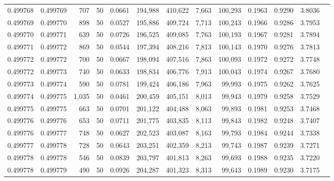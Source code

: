 \begin{tabular}{rrrrrrrrrrrrr}
0.499768 & 0.499769 &   707 &  50 &                                     0.0661 & 194,988 & 410,622 &   7,663 & 100,293 & 0.1963 & 0.9290 & 3.8036 \\
0.499769 & 0.499770 &   898 &  50 &                                     0.0527 & 195,886 & 409,724 &   7,713 & 100,243 & 0.1966 & 0.9286 & 3.7953 \\
0.499770 & 0.499771 &   639 &  50 &                                     0.0726 & 196,525 & 409,085 &   7,763 & 100,193 & 0.1967 & 0.9281 & 3.7894 \\
0.499771 & 0.499772 &   869 &  50 &                                     0.0544 & 197,394 & 408,216 &   7,813 & 100,143 & 0.1970 & 0.9276 & 3.7813 \\
0.499772 & 0.499772 &   700 &  50 &                                     0.0667 & 198,094 & 407,516 &   7,863 & 100,093 & 0.1972 & 0.9272 & 3.7748 \\
0.499772 & 0.499773 &   740 &  50 &                                     0.0633 & 198,834 & 406,776 &   7,913 & 100,043 & 0.1974 & 0.9267 & 3.7680 \\
0.499773 & 0.499774 &   590 &  50 &                                     0.0781 & 199,424 & 406,186 &   7,963 &  99,993 & 0.1975 & 0.9262 & 3.7625 \\
0.499774 & 0.499775 & 1,035 &  50 &                                     0.0461 & 200,459 & 405,151 &   8,013 &  99,943 & 0.1979 & 0.9258 & 3.7529 \\
0.499775 & 0.499775 &   663 &  50 &                                     0.0701 & 201,122 & 404,488 &   8,063 &  99,893 & 0.1981 & 0.9253 & 3.7468 \\
0.499776 & 0.499776 &   653 &  50 &                                     0.0711 & 201,775 & 403,835 &   8,113 &  99,843 & 0.1982 & 0.9248 & 3.7407 \\
0.499776 & 0.499777 &   748 &  50 &                                     0.0627 & 202,523 & 403,087 &   8,163 &  99,793 & 0.1984 & 0.9244 & 3.7338 \\
0.499777 & 0.499778 &   728 &  50 &                                     0.0643 & 203,251 & 402,359 &   8,213 &  99,743 & 0.1987 & 0.9239 & 3.7271 \\
0.499778 & 0.499778 &   546 &  50 &                                     0.0839 & 203,797 & 401,813 &   8,263 &  99,693 & 0.1988 & 0.9235 & 3.7220 \\
0.499778 & 0.499779 &   490 &  50 &                                     0.0926 & 204,287 & 401,323 &   8,313 &  99,643 & 0.1989 & 0.9230 & 3.7175 \\

\end{tabular}
